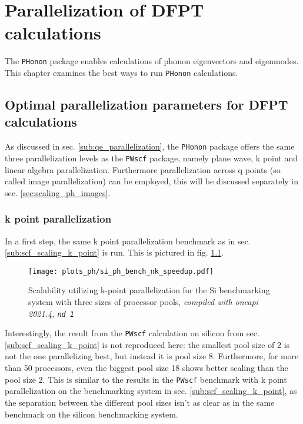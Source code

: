 \documentclass[main.tex]{subfiles}
\begin{document}
\chapter{Parallelization of DFPT calculations}\label{ch:optimization_ph}

The \texttt{PHonon} package enables calculations of phonon eigenvectors and eigenmodes.
This chapter examines the best ways to run \texttt{PHonon} calculations.

\section{Optimal parallelization parameters for DFPT calculations}

As discussed in sec. \ref{sub:qe_parallelization}, the \texttt{PHonon} package offers the same three parallelization levels as the \texttt{PWscf} package, namely plane wave, k point and linear algebra parallelization.
Furthermore parallelization across q points (so called image parallelization) can be employed, this will be discussed separately in sec. \ref{sec:scaling_ph_images}.

\subsection{k point parallelization}

In a first step, the same k point parallelization benchmark as in sec. \ref{sub:scf_scaling_k_point} is run. This is pictured in fig. \ref{fig:scaling_ph_nk_si}.

\begin{figure}[h!]
    \centering
    \texttt{[image: plots\_ph/si\_ph\_bench\_nk\_speedup.pdf]}
    \caption{Scalability utilizing k-point parallelization for the Si benchmarking system with three sizes of processor pools, \emph{\QE compiled with \gls{oneapi} 2021.4, \texttt{nd 1}}}
    \label{fig:scaling_ph_nk_si}
\end{figure}
Interestingly, the result from the \texttt{PWscf} calculation on silicon from sec. \ref{sub:scf_scaling_k_point} is not reproduced here: the smallest pool size of 2 is not the one parallelizing best, but instead it is pool size 8.
Furthermore, for more than 50 processors, even the biggest pool size 18 shows better scaling than the pool size 2.
This is similar to the results in the \texttt{PWscf} benchmark with k point parallelization on the \TaS benchmarking system in sec. \ref{sub:scf_scaling_k_point}, as the separation between the different pool sizes isn't as clear as in the same benchmark on the silicon benchmarking system.
\end{document}
